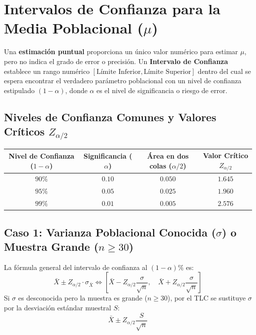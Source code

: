 \section{Intervalos de Confianza para la Media Poblacional ($\mu$)}
Una \textbf{estimación puntual} proporciona un único valor numérico para estimar $\mu$, pero no indica el grado de error o precisión. Un \textbf{Intervalo de Confianza} establece un rango numérico $[\text{Límite Inferior}, \text{Límite Superior}]$ dentro del cual se espera encontrar el verdadero parámetro poblacional con un nivel de confianza estipulado $(1 - \alpha)$, donde $\alpha$ es el nivel de significancia o riesgo de error.

\subsection{Niveles de Confianza Comunes y Valores Críticos $Z_{\alpha/2}$}
\begin{center}
\begin{tabular}{cccc}
\toprule
\textbf{Nivel de Confianza ($1 - \alpha$)} & \textbf{Significancia ($\alpha$)} & \textbf{Área en dos colas ($\alpha/2$)} & \textbf{Valor Crítico $Z_{\alpha/2}$} \\
\midrule
$90\%$ & $0.10$ & $0.050$ & $1.645$ \\
$95\%$ & $0.05$ & $0.025$ & $1.960$ \\
$99\%$ & $0.01$ & $0.005$ & $2.576$ \\
\bottomrule
\end{tabular}
\end{center}

\subsection{Caso 1: Varianza Poblacional Conocida ($\sigma$) o Muestra Grande ($n \ge 30$)}
La fórmula general del intervalo de confianza al $(1 - \alpha)\%$ es:
\begin{equation}
    \bar{X} \pm Z_{\alpha/2} \cdot \sigma_{\bar{X}} \iff \left[ \bar{X} - Z_{\alpha/2} \frac{\sigma}{\sqrt{n}}, \quad \bar{X} + Z_{\alpha/2} \frac{\sigma}{\sqrt{n}} \right]
\end{equation}
Si $\sigma$ es desconocida pero la muestra es grande ($n \ge 30$), por el TLC se sustituye $\sigma$ por la desviación estándar muestral $S$:
\begin{equation}
    \bar{X} \pm Z_{\alpha/2} \frac{S}{\sqrt{n}}
\end{equation}

